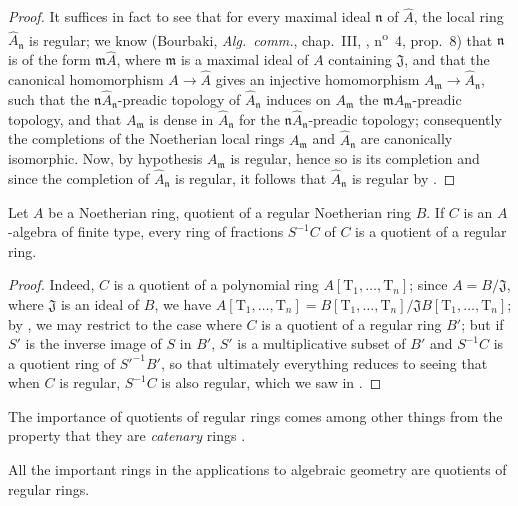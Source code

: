 \begin{proof}
It suffices in fact  to see that for every maximal ideal $\mathfrak{n}$ of $\widehat{A}$, the local ring $\widehat{A}_\mathfrak{n}$ is regular;
  we know (Bourbaki, \emph{Alg.~comm.}, chap.~III, , n\textsuperscript{o}~4, prop.~8) that $\mathfrak{n}$
is of the form $\mathfrak{m}\widehat{A}$, where $\mathfrak{m}$ is a maximal ideal of $A$ containing $\mathfrak{J}$, and that the canonical homomorphism $A\to\widehat{A}$ gives an injective homomorphism $A_\mathfrak{m}\to\widehat{A}_\mathfrak{n}$, such that the $\mathfrak{n}\widehat{A}_\mathfrak{n}$-preadic topology of $\widehat{A}_\mathfrak{n}$ induces on $A_\mathfrak{m}$ the $\mathfrak{m}A_\mathfrak{m}$-preadic topology, and that $A_\mathfrak{m}$ is dense in $\widehat{A}_\mathfrak{n}$ for the $\mathfrak{n}\widehat{A}_\mathfrak{n}$-preadic topology;
consequently the completions of the Noetherian local rings $A_\mathfrak{m}$ and $\widehat{A}_\mathfrak{n}$ are canonically isomorphic.
Now, by hypothesis $A_\mathfrak{m}$ is regular, hence so is its completion  and since the completion of $\widehat{A}_\mathfrak{n}$ is regular, it follows that $\widehat{A}_\mathfrak{n}$ is regular by .
\end{proof}

\begin{corollary}[17.3.9]
\label{0.17.3.9}
Let $A$ be a Noetherian ring, quotient of a regular Noetherian ring $B$.
If $C$ is an $A$-algebra of finite type, every ring of fractions $S^{-1}C$ of $C$ is a quotient of a regular ring.
\end{corollary}

\begin{proof}
Indeed, $C$ is a quotient of a polynomial ring $A[\mathrm{T}_1,\ldots,\mathrm{T}_n]$;
since $A=B/\mathfrak{J}$, where $\mathfrak{J}$ is an ideal of $B$, we have $A[\mathrm{T}_1,\ldots,\mathrm{T}_n]=B[\mathrm{T}_1,\ldots,\mathrm{T}_n]/\mathfrak{J}B[\mathrm{T}_1,\ldots,\mathrm{T}_n]$;
by , we may restrict to the case where $C$ is a quotient of a regular ring $B'$;
but if $S'$ is the inverse image of $S$ in $B'$, $S'$ is a multiplicative subset of $B'$ and $S^{-1}C$ is a quotient ring of $S'^{-1}B'$, so that ultimately everything reduces to seeing that when $C$ is regular, $S^{-1}C$ is also regular, which we saw in .
\end{proof}

The importance of quotients of regular rings comes among other things from the property that they are \emph{catenary} rings .

All the important rings in the applications to algebraic geometry are quotients of regular rings.
